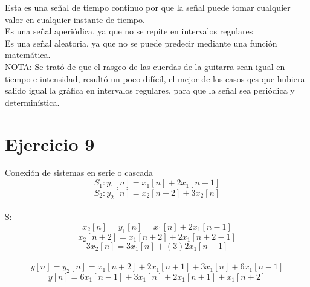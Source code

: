 \documentclass[10pt,a4paper]{report}
\begin{document}
\begin{itemize}
Esta es una señal de tiempo continuo por que la señal puede tomar cualquier valor en cualquier instante de tiempo. \\
Es una señal aperiódica, ya que no se repite en intervalos regulares \\
Es una señal aleatoria, ya que no se puede predecir mediante una función matemática.\\
NOTA: Se trató de que el rasgeo de las cuerdas de la guitarra sean igual en tiempo e intensidad, resultó un poco difícil, el mejor de los casos qes que hubiera salido igual la gráfica en intervalos regulares, para que la señal sea periódica y determinística.

\end{itemize}

\section{Ejercicio 9}

Conexión de sistemas en serie o cascada\\
\begin{equation}
S_{1}: y_{1}\left [ n \right ]=x_{1}\left [ n \right ]+2x_{1}\left [ n-1 \right ]
\end{equation}
\begin{equation}
S_{2}: y_{2}\left [ n \right ]=x_{2}\left [ n+2 \right ]+3x_{2}\left [ n \right ]
\end{equation}\\

S:\\
\begin{equation}
x_{2}\left [ n \right ]=y_{1}\left [ n \right ]=x_{1}\left [ n \right ]+2x_{1}\left [ n-1 \right ]
\end{equation}
\begin{equation}
x_{2}\left [ n+2 \right ]=x_{1}\left [ n+2 \right ]+2x_{1}\left [ n+2-1 \right ]
\end{equation}
\begin{equation}
3x_{2}\left [ n \right ]=3x_{1}\left [ n \right ]+(3)2x_{1}\left [ n-1 \right ]
\end{equation}\\

\begin{equation}
y\left [ n \right ]=y_{2}\left [ n \right ]=x_{1}\left [ n+2 \right ]+2x_{1}\left [ n+1 \right ]+3x_{1}\left [ n \right ]+6x_{1}\left [ n-1 \right ]
\end{equation}
\begin{equation}
y\left [ n \right ]=6x_{1}\left [ n-1 \right ]+3x_{1}\left [ n \right ]+2x_{1}\left [ n+1 \right ]+x_{1}\left [ n+2 \right ]
\end{equation}\\
\end{document}
